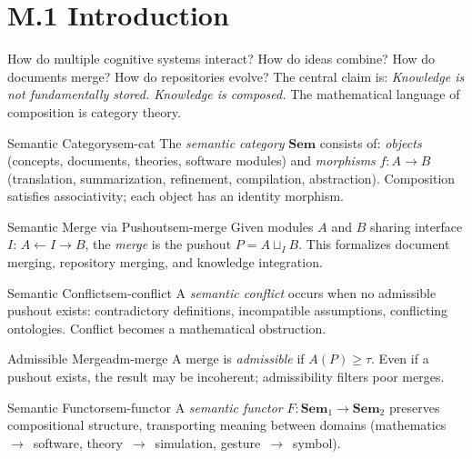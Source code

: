 
\section*{M.1 Introduction}

How do multiple cognitive systems interact? How do ideas combine? How do
documents merge? How do repositories evolve? The central claim is:
\emph{Knowledge is not fundamentally stored. Knowledge is composed.}
The mathematical language of composition is category theory.

\begin{definition}{Semantic Category}{sem-cat}
  The \emph{semantic category} $\mathbf{Sem}$ consists of:
  \emph{objects} (concepts, documents, theories, software modules) and
  \emph{morphisms} $f : A \to B$ (translation, summarization, refinement,
  compilation, abstraction). Composition satisfies associativity;
  each object has an identity morphism.
\end{definition}

\begin{definition}{Semantic Merge via Pushout}{sem-merge}
  Given modules $A$ and $B$ sharing interface $I$:
  $A \leftarrow I \to B$, the \emph{merge} is the pushout
  $P = A \sqcup_I B$. This formalizes document merging,
  repository merging, and knowledge integration.
\end{definition}

\begin{definition}{Semantic Conflict}{sem-conflict}
  A \emph{semantic conflict} occurs when no admissible pushout exists:
  contradictory definitions, incompatible assumptions, conflicting ontologies.
  Conflict becomes a mathematical obstruction.
\end{definition}

\begin{definition}{Admissible Merge}{adm-merge}
  A merge is \emph{admissible} if $A(P) \geq \tau$.
  Even if a pushout exists, the result may be incoherent;
  admissibility filters poor merges.
\end{definition}

\begin{definition}{Semantic Functor}{sem-functor}
  A \emph{semantic functor} $F : \mathbf{Sem}_1 \to \mathbf{Sem}_2$
  preserves compositional structure, transporting meaning between domains
  (mathematics~$\to$~software, theory~$\to$~simulation, gesture~$\to$~symbol).
\end{definition}

